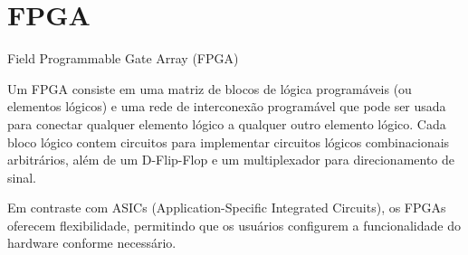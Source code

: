 \documentclass[aspectratio=169]{beamer}
\begin{document}
\section{FPGA}
\begin{frame}{Field Programmable Gate Array (FPGA)}
	\justifying
	

	
	\begin{block}{}
		\justifying
		Um FPGA consiste em uma matriz de blocos de lógica programáveis (ou elementos lógicos) e uma rede de interconexão programável que pode ser usada para conectar qualquer elemento lógico a qualquer outro elemento lógico. Cada bloco lógico contem circuitos para implementar circuitos lógicos combinacionais arbitrários, além de um D-Flip-Flop e um multiplexador para direcionamento de sinal. 
		
	\end{block}	

		
	\begin{block}{}
	\justifying
	Em contraste com ASICs (Application-Specific Integrated Circuits), os FPGAs oferecem flexibilidade, permitindo que os usuários configurem a funcionalidade do hardware conforme necessário.
	
	\end{block}			
	
%	
%	
	
	

	

		
\end{frame}
\end{document}
